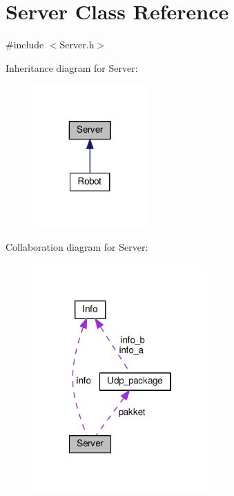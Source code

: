 \hypertarget{classServer}{\section{Server Class Reference}
\label{classServer}
}


{\ttfamily \#include $<$Server.\-h$>$}



Inheritance diagram for Server\-:
\nopagebreak
\begin{figure}[H]
\begin{center}
\leavevmode
\includegraphics[width=124pt]{classServer__inherit__graph}
\end{center}
\end{figure}


Collaboration diagram for Server\-:
\nopagebreak
\begin{figure}[H]
\begin{center}
\leavevmode
\includegraphics[width=189pt]{classServer__coll__graph}
\end{center}
\end{figure}
